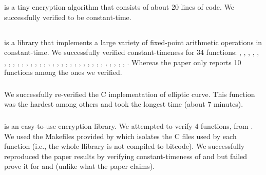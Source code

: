 \subsubsection{}
 is a tiny encryption algorithm that consists of about 20 lines
of code. We successfully verified  to be constant-time.



\subsection{} 
is a library that implements a large variety of fixed-point arithmetic
operations in constant-time. We successfully verified constant-timeness for 34
functions:
,
,
,
,
,
,
,
,
,
,
,
,
,
,
,
,
,
,
,
,
,
,
,
,
,
,
,
,
,
,
,
,
,
.
Whereas the paper only reports 10 functions among the ones we verified.

\subsubsection{} We successfully re-verified the C
implementation of  elliptic curve. This function
was the hardest among others and took the longest time (about 7 minutes).


\subsubsection{}  is an easy-to-use
encryption library. We attempted to verify 4 functions,  from . We used the Makefiles
provided by \ctVerif which isolates the C files used by each function (i.e., the
whole llibrary is not compiled to  bitcode). We successfully
reproduced the paper results by verifying constant-timeness of
 and  but failed prove it for
 and  (unlike what the paper claims).


